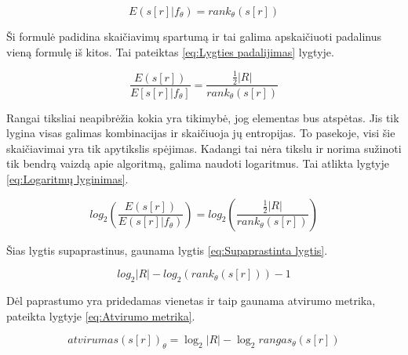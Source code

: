 \documentclass{VUMIFInfBakalaurinis}
\begin{document}
\begin{equation}
E(s[r]|f_{\theta}) = rank_{\theta}(s[r])
\label{eq:Entropija}
\end{equation} 

\par Ši formulė padidina skaičiavimų spartumą ir tai galima apskaičiuoti padalinus vieną formulę iš kitos. Tai pateiktas \eqref{eq:Lygties padalijimas} lygtyje.

\begin{equation}
\frac{E(s[r])}{E[s[r]|f_{\theta}]} = \frac{\frac{1}{2}|R|}{rank_{\theta}(s[r])}
\label{eq:Lygties padalijimas}
\end{equation}

\par Rangai tiksliai neapibrėžia kokia yra tikimybė, jog elementas bus atspėtas. Jis tik lygina visas galimas kombinacijas ir skaičiuoja jų entropijas. To pasekoje, visi šie skaičiavimai yra tik apytikslis spėjimas. Kadangi tai nėra tikslu ir norima sužinoti tik bendrą vaizdą apie algoritmą, galima naudoti logaritmus. Tai atlikta lygtyje \eqref{eq:Logaritmų lyginimas}.

\begin{equation}
log_{2}(\frac{E(s[r])}{E(s[r]|f_{\theta})}) = log_{2}(\frac{\frac{1}{2}|R|}{rank_{\theta}(s[r])})
\label{eq:Logaritmų lyginimas}
\end{equation}

\par Šias lygtis supaprastinus, gaunama lygtis \eqref{eq:Supaprastinta lygtis}.

\begin{equation}
log_{2}|R| - log_{2}(rank_{\theta}(s[r])) - 1
\label{eq:Supaprastinta lygtis}
\end{equation}

\par Dėl paprastumo yra pridedamas vienetas ir taip gaunama atvirumo metrika, pateikta lygtyje \eqref{eq:Atvirumo metrika}.

\begin{equation}
atvirumas(s[r])_{\theta} = \log_2 | R | - \log_2 rangas_{\theta}(s[r])
\label{eq:Atvirumo metrika}
\end{equation}
\end{document}
